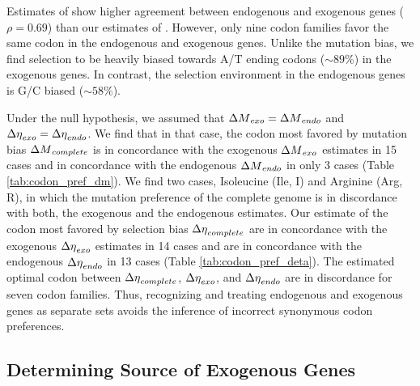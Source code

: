 \documentclass[12pt]{article}
\begin{document}
Estimates of \DE show higher agreement between endogenous and exogenous genes ($\rho = 0.69$) than our estimates of \DM.
However, only nine codon families favor the same codon in the endogenous and exogenous genes.
Unlike the mutation bias, we find selection to be heavily biased towards A/T ending codons ($\sim 89 \%$) in the exogenous genes.
In contrast, the selection environment in the endogenous genes is G/C biased ($\sim 58 \%$).

Under the null hypothesis, we assumed that ${\Delta M}_{exo} = {\Delta M}_{endo}$ and ${\Delta \eta}_{exo} = {\Delta \eta}_{endo}$.
We find that in that case, the codon most favored by mutation bias ${\Delta M}_{complete}$ is in concordance with the exogenous ${\Delta M}_{exo}$ estimates in 15 cases and in concordance with the endogenous ${\Delta M}_{endo}$ in only 3 cases (Table \ref{tab:codon_pref_dm}).
We find two cases, Isoleucine (Ile, I) and Arginine (Arg, R), in which the mutation preference of the complete genome is in discordance with both, the exogenous and the endogenous estimates.
Our estimate of the codon most favored by selection bias ${\Delta \eta}_{complete}$ are in concordance with the exogenous ${\Delta \eta}_{exo}$ estimates in 14 cases and are in concordance with the endogenous ${\Delta \eta}_{endo}$ in 13 cases (Table \ref{tab:codon_pref_deta}).
The estimated optimal codon between ${\Delta \eta}_{complete}$, ${\Delta \eta}_{exo}$, and ${\Delta \eta}_{endo}$ are in discordance for seven codon families.
Thus, recognizing and treating endogenous and exogenous genes as separate sets avoids the inference of incorrect synonymous codon preferences.

\subsection*{Determining Source of Exogenous Genes}
\end{document}
